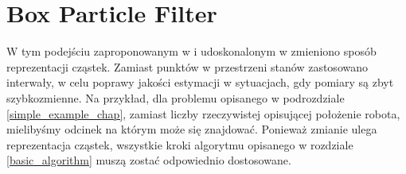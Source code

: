 \section{Box Particle Filter} \label{bpf_chapter}
W tym podejściu zaproponowanym w \cite{bpf_base} i udoskonalonym w \cite{brbpf} zmieniono sposób reprezentacji cząstek. Zamiast punktów w przestrzeni stanów zastosowano interwały, w celu poprawy jakości estymacji w sytuacjach, gdy pomiary są zbyt szybkozmienne. Na przykład, dla problemu opisanego w podrozdziale \ref{simple_example_chap}, zamiast liczby rzeczywistej opisującej położenie robota, mielibyśmy odcinek na którym może się znajdować. Ponieważ zmianie ulega reprezentacja cząstek, wszystkie kroki algorytmu opisanego w rozdziale \ref{basic_algorithm} muszą zostać odpowiednio dostosowane.

